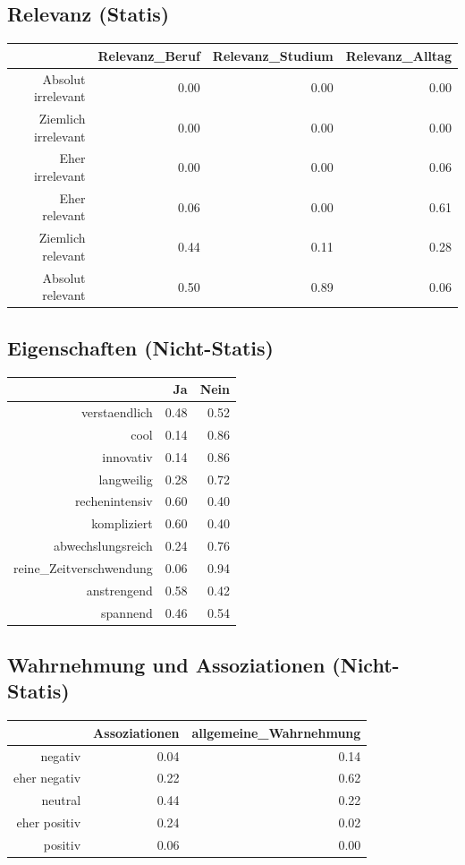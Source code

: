 \documentclass[12pt,a4paper,titlepage=true,parskip,ngerman]{scrartcl}
\begin{document}
\subsection{Relevanz (Statis)}
\begin{table}[ht]
\begin{tabular}{rrrr}
  \hline
 & Relevanz\_Beruf & Relevanz\_Studium & Relevanz\_Alltag \\ 
  \hline
Absolut irrelevant & 0.00 & 0.00 & 0.00 \\ 
  Ziemlich irrelevant & 0.00 & 0.00 & 0.00 \\ 
  Eher irrelevant & 0.00 & 0.00 & 0.06 \\ 
  Eher relevant & 0.06 & 0.00 & 0.61 \\ 
  Ziemlich relevant & 0.44 & 0.11 & 0.28 \\ 
  Absolut relevant & 0.50 & 0.89 & 0.06 \\ 
   \hline
\end{tabular}
\end{table}


\subsection{Eigenschaften (Nicht-Statis)}
\begin{table}[ht]
\begin{tabular}{rrr}
  \hline
 & Ja & Nein \\ 
  \hline
verstaendlich & 0.48 & 0.52 \\ 
  cool & 0.14 & 0.86 \\ 
  innovativ & 0.14 & 0.86 \\ 
  langweilig & 0.28 & 0.72 \\ 
  rechenintensiv & 0.60 & 0.40 \\ 
  kompliziert & 0.60 & 0.40 \\ 
  abwechslungsreich & 0.24 & 0.76 \\ 
  reine\_Zeitverschwendung & 0.06 & 0.94 \\ 
  anstrengend & 0.58 & 0.42 \\ 
  spannend & 0.46 & 0.54 \\ 
   \hline
\end{tabular}
\end{table}

\newpage
\subsection{Wahrnehmung und Assoziationen (Nicht-Statis)}
\begin{table}[ht]
\begin{tabular}{rrr}
  \hline
 & Assoziationen & allgemeine\_Wahrnehmung \\ 
  \hline
negativ & 0.04 & 0.14 \\ 
  eher negativ & 0.22 & 0.62 \\ 
  neutral & 0.44 & 0.22 \\ 
  eher positiv & 0.24 & 0.02 \\ 
  positiv & 0.06 & 0.00 \\ 
   \hline
\end{tabular}
\end{table}
\end{document}
